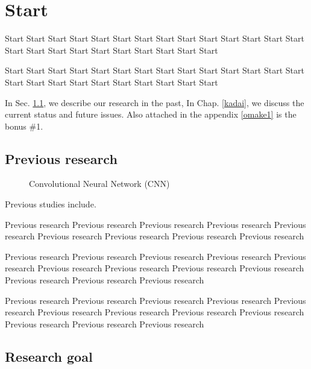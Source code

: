 \documentclass[12pt]{article} %
\begin{document}
%
%
\titlepage
\cmemberspage
\firstabstract
%
%
\toc
\newpage
\listoffigures
\listoftables
%
%
\newpage
\section{Start}

Start Start Start Start Start Start Start Start 
Start Start Start Start Start Start Start Start 
Start Start Start Start Start Start Start Start 

Start Start Start Start Start Start Start Start 
Start Start Start Start Start Start Start Start 
Start Start Start Start Start Start Start Start 

In Sec. \ref{kako}, we describe our research in the past,
In Chap. \ref{kadai}, we discuss the current status and future issues.
Also attached in the appendix \ref{omake1} is the bonus \#1.


\subsection{Previous research}
\label{kako}


\begin{figure*}[t]
 \centering
 \caption{Convolutional Neural Network (CNN)}
 \label{fig:CNN}
\end{figure*}

Previous studies include\cite{alex_nips12}.

Previous research Previous research Previous research 
Previous research Previous research Previous research 
Previous research Previous research Previous research 

Previous research Previous research Previous research 
Previous research Previous research Previous research 
Previous research Previous research Previous research 
Previous research Previous research Previous research 

Previous research Previous research Previous research 
Previous research Previous research Previous research 
Previous research Previous research Previous research 
Previous research Previous research Previous research 

\subsection{Research goal}
\end{document}
